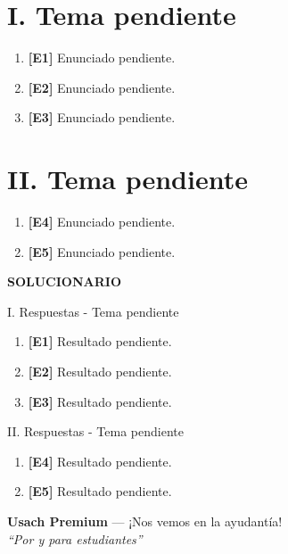 \documentclass[letterpaper,12pt]{article}
\newcommand{\fraseinstitucional}{``Por y para estudiantes''}
\begin{document}
\section*{I. Tema pendiente}
\begin{enumerate}[label=\textbf{\arabic*)},leftmargin=*,itemsep=0.65cm]
  \item \textbf{[E1]} Enunciado pendiente.
  \item \textbf{[E2]} Enunciado pendiente.
  \item \textbf{[E3]} Enunciado pendiente.
\end{enumerate}

\section*{II. Tema pendiente}
\begin{enumerate}[label=\textbf{\arabic*)},leftmargin=*,itemsep=0.65cm,start=4]
  \item \textbf{[E4]} Enunciado pendiente.
  \item \textbf{[E5]} Enunciado pendiente.
\end{enumerate}

\newpage
\begin{center}
  \begin{tcolorbox}[colback=azulFuerte,colframe=azulFuerte,colupper=white,
    width=0.8\textwidth,arc=9pt]
    \centering\Large\textbf{SOLUCIONARIO}
  \end{tcolorbox}
\end{center}

\begin{solbox}{I. Respuestas - Tema pendiente}
\begin{enumerate}[label=\color{azulFuerte}\bfseries\arabic*),leftmargin=*]
  \item \textbf{[E1]} Resultado pendiente.
  \item \textbf{[E2]} Resultado pendiente.
  \item \textbf{[E3]} Resultado pendiente.
\end{enumerate}
\end{solbox}

\begin{solbox}{II. Respuestas - Tema pendiente}
\begin{enumerate}[label=\color{azulFuerte}\bfseries\arabic*),leftmargin=*,start=4]
  \item \textbf{[E4]} Resultado pendiente.
  \item \textbf{[E5]} Resultado pendiente.
\end{enumerate}
\end{solbox}

\vfill
\begin{center}
  \textbf{Usach Premium} --- ¡Nos vemos en la ayudantía!\\
  \textit{\fraseinstitucional}
\end{center}
\end{document}
